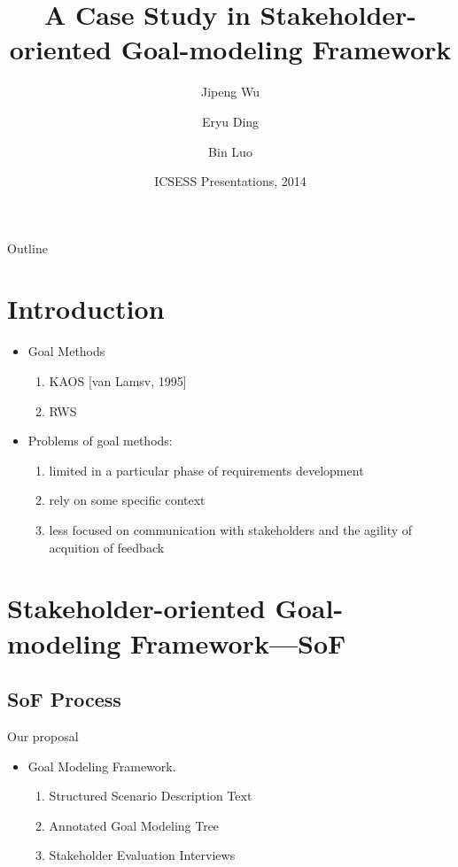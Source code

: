 ﻿\documentclass{beamer}
\title[A Case Study in SoF] {A Case Study in Stakeholder-oriented Goal-modeling Framework}
\subtitle{}
\author[Author]{Jipeng Wu \and Eryu Ding \and Bin Luo}
\institute[Universities of Somewhere and Elsewhere] {
                                 Software Institute\\
                                 Nanjing University
     }
\date[ICSESS 2014]
{ICSESS Presentations, 2014}
\begin{document}
\begin{frame}
  \titlepage
\end{frame}

\begin{frame}{Outline}
  \tableofcontents
\end{frame}

\section{Introduction}  
\begin{frame}              %
  \small{
    \begin{itemize}
    \item
      Goal Methods
      \begin{enumerate}
      \item KAOS [van Lamsv, 1995] %
      \item RWS %
      \end{enumerate}
    \item
      Problems of goal methods:
      \begin{enumerate}
      \item limited in a particular phase of requirements development
      \item rely on some specific context
      \item less focused on communication with stakeholders and the agility of acquition of feedback %
      \end{enumerate}
    \end{itemize}
  }
\end{frame}

\section{Stakeholder-oriented Goal-modeling Framework—SoF}
\subsection{SoF Process}%
\begin{frame}   {Our proposal}         %
  \small{
    \begin{itemize}
    \item
      Goal Modeling Framework. %
      \begin{enumerate}
      \item Structured Scenario Description Text
      \item Annotated Goal Modeling Tree
      \item Stakeholder Evaluation Interviews
      \end{enumerate}
    \end{itemize}
  }
\end{frame}
\end{document}
